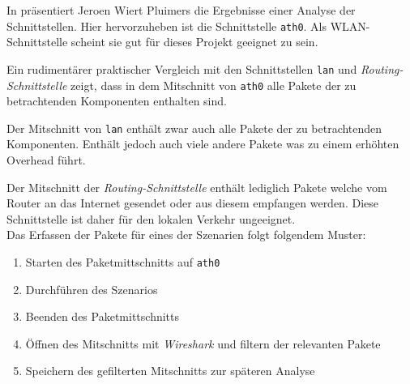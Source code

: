 In \cite{fritzcap8:online} präsentiert Jeroen Wiert Pluimers die Ergebnisse einer Analyse der Schnittstellen.
Hier hervorzuheben ist die Schnittstelle \texttt{ath0}. Als WLAN-Schnittstelle scheint sie gut für dieses Projekt geeignet zu sein.

Ein rudimentärer praktischer Vergleich mit den Schnittstellen \texttt{lan} und \textit{Routing-Schnittstelle} zeigt,
dass in dem Mitschnitt von \texttt{ath0} alle Pakete der zu betrachtenden Komponenten enthalten sind.

Der Mitschnitt von \texttt{lan} enthält zwar auch alle Pakete der zu betrachtenden Komponenten.
Enthält jedoch auch viele andere Pakete was zu einem erhöhten Overhead führt.

Der Mitschnitt der \textit{Routing-Schnittstelle} enthält lediglich Pakete welche vom Router an das Internet gesendet
oder aus diesem empfangen werden.
Diese Schnittstelle ist daher für den lokalen Verkehr ungeeignet.\\

Das Erfassen der Pakete für eines der Szenarien folgt folgendem Muster:
\begin{enumerate}
    \setlength\itemsep{-0.5em}
    \item Starten des Paketmittschnitts auf \texttt{ath0}
    \item Durchführen des Szenarios
    \item Beenden des Paketmittschnitts
    \item Öffnen des Mitschnitts mit \textit{Wireshark} und filtern der relevanten Pakete
    \item Speichern des gefilterten Mitschnitts zur späteren Analyse
\end{enumerate}